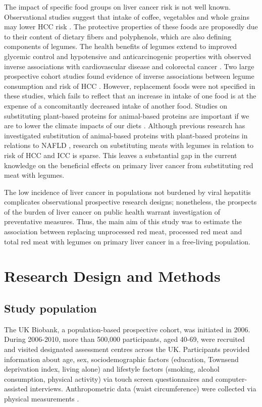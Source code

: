 \documentclass[nutrients,article,submit,moreauthors,pdftex]{Definitions/mdpi}
\begin{document}
The impact of specific food groups on liver cancer risk is not well
known. Observational studies suggest that intake of coffee, vegetables
and whole grains may lower HCC risk
\citep{zhang2013, yang2014, Liu2021, Bhurwal2020}. The protective
properties of these foods are proposedly due to their content of dietary
fibers and polyphenols, which are also defining components of legumes.
The health benefits of legumes extend to improved glycemic control and
hypotensive and anticarcinogenic properties with observed inverse
associations with cardiovascular disease and colorectal cancer
\citep{viguiliouk2019, jin2022}. Two large prospective cohort studies
found evidence of inverse associations between legume consumption and
risk of HCC \citep{zhang2013, Liu2021}. However, replacement foods were
not specified in these studies, which fails to reflect that an increase
in intake of one food is at the expense of a concomitantly decreased
intake of another food. Studies on substituting plant-based proteins for
animal-based proteins are important if we are to lower the climate
impacts of our diets \citep{RN71}. Although previous research has
investigated substitution of animal-based proteins with plant-based
proteins in relations to NAFLD \citep{Zhang2023}, research on
substituting meats with legumes in relation to risk of HCC and ICC is
sparse. This leaves a substantial gap in the current knowledge on the
beneficial effects on primary liver cancer from substituting red meat
with legumes.

The low incidence of liver cancer in populations not burdened by viral
hepatitis complicates observational prospective research designs;
nonetheless, the prospects of the burden of liver cancer on public
health warrant investigation of preventative measures. Thus, the main
aim of this study was to estimate the association between replacing
unprocessed red meat, processed red meat and total red meat with legumes
on primary liver cancer in a free-living population.

\hypertarget{sec2}{%
\section{Research Design and Methods}\label{sec2}}

\hypertarget{subsec1}{%
\subsection{Study population}\label{subsec1}}

The UK Biobank, a population-based prospective cohort, was initiated in
2006. \citep{sudlow2015} During 2006-2010, more than 500,000
participants, aged 40-69, were recruited and visited designated
assessment centres across the UK. Participants provided information
about age, sex, sociodemographic factors (education, Townsend
deprivation index, living alone) and lifestyle factors (smoking, alcohol
consumption, physical activity) via touch screen questionnaires and
computer-assisted interviews. Anthropometric data (waist circumference)
were collected via physical measurements \citep{RN113}.
\end{document}
